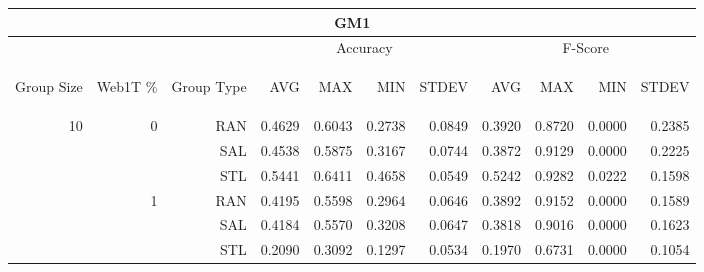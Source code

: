 \begin{center}
\begin{table}[htbp] 
 \begin{center}
\begin{tabular}{ | r | r | r | r | r | r | r | r | r | r | r |}
\hline
\multicolumn{11}{|c|}{GM1}\\
\hline
 & & & \multicolumn{4}{|c|}{Accuracy} & \multicolumn{4}{|c|}{F-Score}\\ \cline{4-11}
\begin{sideways}Group Size\end{sideways} & \begin{sideways}Web1T \%\end{sideways} & \begin{sideways}Group Type\end{sideways} & \begin{sideways}AVG\end{sideways} & \begin{sideways}MAX\end{sideways} & \begin{sideways}MIN\end{sideways} & \begin{sideways}STDEV\end{sideways} & \begin{sideways}AVG\end{sideways} & \begin{sideways}MAX\end{sideways} & \begin{sideways}MIN\end{sideways} & \begin{sideways}STDEV\end{sideways}\\
\hline
\multirow{18}{*}{10}
 & \multirow{3}{*}{0} & RAN & 0.4629 & 0.6043 & 0.2738 & 0.0849 & 0.3920 & 0.8720 & 0.0000 & 0.2385\\ \cline{3-11}
 &   & SAL & 0.4538 & 0.5875 & 0.3167 & 0.0744 & 0.3872 & 0.9129 & 0.0000 & 0.2225\\ \cline{3-11}
 &   & STL & 0.5441 & 0.6411 & 0.4658 & 0.0549 & 0.5242 & 0.9282 & 0.0222 & 0.1598\\ \cline{2-11}
 & \multirow{3}{*}{1} & RAN & 0.4195 & 0.5598 & 0.2964 & 0.0646 & 0.3892 & 0.9152 & 0.0000 & 0.1589\\ \cline{3-11}
 &   & SAL & 0.4184 & 0.5570 & 0.3208 & 0.0647 & 0.3818 & 0.9016 & 0.0000 & 0.1623\\ \cline{3-11}
 &   & STL & 0.2090 & 0.3092 & 0.1297 & 0.0534 & 0.1970 & 0.6731 & 0.0000 & 0.1054\\ \cline{2-11}

\end{tabular}
\end{center}
\end{table}
\end{center}
